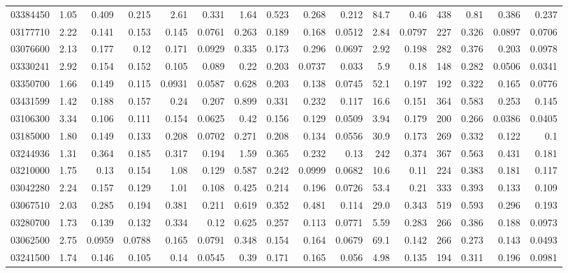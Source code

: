 \begin{longtable}{l r rr rr rr rr rr rr rr}
03384450 & 1.05 & 0.409 & {0.215} & 2.61 & {0.331} & 1.64 & {0.523} & 0.268 & {0.212} & 84.7 & {0.46} & 438 & {0.81} & 0.386 & {0.237}\\
03177710 & 2.22 & 0.141 & 0.153 & 0.145 & {0.0761} & 0.263 & {0.189} & 0.168 & {0.0512} & 2.84 & {0.0797} & 227 & {0.326} & 0.0897 & {0.0706}\\
03076600 & 2.13 & 0.177 & {0.12} & 0.171 & {0.0929} & 0.335 & {0.173} & 0.296 & {0.0697} & 2.92 & {0.198} & 282 & {0.376} & 0.203 & {0.0978}\\
03330241 & 2.92 & 0.154 & {0.152} & 0.105 & {0.089} & 0.22 & {0.203} & 0.0737 & {0.033} & 5.9 & {0.18} & 148 & {0.282} & 0.0506 & {0.0341}\\
03350700 & 1.66 & 0.149 & {0.115} & 0.0931 & {0.0587} & 0.628 & {0.203} & 0.138 & {0.0745} & 52.1 & {0.197} & 192 & {0.322} & 0.165 & {0.0776}\\
03431599 & 1.42 & 0.188 & {0.157} & 0.24 & {0.207} & 0.899 & {0.331} & 0.232 & {0.117} & 16.6 & {0.151} & 364 & {0.583} & 0.253 & {0.145}\\
03106300 & 3.34 & 0.106 & 0.111 & 0.154 & {0.0625} & 0.42 & {0.156} & 0.129 & {0.0509} & 3.94 & {0.179} & 200 & {0.266} & 0.0386 & 0.0405\\
03185000 & 1.80 & 0.149 & {0.133} & 0.208 & {0.0702} & 0.271 & {0.208} & 0.134 & {0.0556} & 30.9 & {0.173} & 269 & {0.332} & 0.122 & {0.1}\\
03244936 & 1.31 & 0.364 & {0.185} & 0.317 & {0.194} & 1.59 & {0.365} & 0.232 & {0.13} & 242 & {0.374} & 367 & {0.563} & 0.431 & {0.181}\\
03210000 & 1.75 & 0.13 & 0.154 & 1.08 & {0.129} & 0.587 & {0.242} & 0.0999 & {0.0682} & 10.6 & {0.11} & 224 & {0.383} & 0.181 & {0.117}\\
03042280 & 2.24 & 0.157 & {0.129} & 1.01 & {0.108} & 0.425 & {0.214} & 0.196 & {0.0726} & 53.4 & {0.21} & 333 & {0.393} & 0.133 & {0.109}\\
03067510 & 2.03 & 0.285 & {0.194} & 0.381 & {0.211} & 0.619 & {0.352} & 0.481 & {0.114} & 29.0 & {0.343} & 519 & {0.593} & 0.296 & {0.193}\\
03280700 & 1.73 & 0.139 & {0.132} & 0.334 & {0.12} & 0.625 & {0.257} & 0.113 & {0.0771} & 5.59 & {0.283} & 266 & {0.386} & 0.188 & {0.0973}\\
03062500 & 2.75 & 0.0959 & {0.0788} & 0.165 & {0.0791} & 0.348 & {0.154} & 0.164 & {0.0679} & 69.1 & {0.142} & 266 & {0.273} & 0.143 & {0.0493}\\
03241500 & 1.74 & 0.146 & {0.105} & 0.14 & {0.0545} & 0.39 & {0.171} & 0.165 & {0.056} & 4.98 & {0.135} & 194 & {0.311} & 0.196 & {0.0981}\\

\end{longtable}
